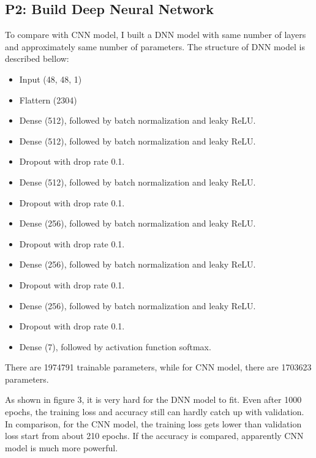 \documentclass[fleqn,a4paper,12pt]{article}
\begin{document}
\subsection*{P2: Build Deep Neural Network}

To compare with CNN model, I built a DNN model with same number of layers and approximately same number of parameters. The structure of DNN model is described bellow:

\begin{itemize}
\item Input (48, 48, 1)
\item Flattern (2304)
\item Dense (512), followed by batch normalization and leaky ReLU.
\item Dense (512), followed by batch normalization and leaky ReLU.
\item Dropout with drop rate 0.1.
\item Dense (512), followed by batch normalization and leaky ReLU.
\item Dropout with drop rate 0.1.
\item Dense (256), followed by batch normalization and leaky ReLU.
\item Dropout with drop rate 0.1.
\item Dense (256), followed by batch normalization and leaky ReLU.
\item Dropout with drop rate 0.1.
\item Dense (256), followed by batch normalization and leaky ReLU.
\item Dropout with drop rate 0.1.
\item Dense (7), followed by activation function softmax.
\end{itemize}
There are 1974791 trainable parameters, while for CNN model, there are 1703623 parameters.

As shown in figure 3, it is very hard for the DNN model to fit. Even after 1000 epochs, the training loss and accuracy still can hardly catch up with validation. In comparison, for the CNN model, the training loss gets lower than validation loss start from about 210 epochs. If the accuracy is compared, apparently CNN model is much more powerful. 
\end{document}
